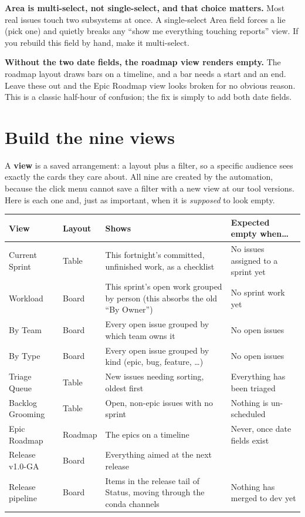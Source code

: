 \documentclass[11pt,a4paper]{report}
\begin{document}
\begin{gotcha}
\textbf{Area is multi-select, not single-select, and that choice matters.} Most real
issues touch two subsystems at once. A single-select Area field forces a lie (pick
one) and quietly breaks any ``show me everything touching reports'' view. If you
rebuild this field by hand, make it multi-select.
\end{gotcha}

\begin{gotcha}
\textbf{Without the two date fields, the roadmap view renders empty.} The roadmap
layout draws bars on a timeline, and a bar needs a start and an end. Leave these
out and the Epic Roadmap view looks broken for no obvious reason. This is a classic
half-hour of confusion; the fix is simply to add both date fields.
\end{gotcha}

\chapter{Build the nine views}

A \textbf{view} is a saved arrangement: a layout plus a filter, so a specific
audience sees exactly the cards they care about. All nine are created by the
automation, because the click menu cannot save a filter with a new view at our tool
versions. Here is each one and, just as important, when it is \emph{supposed} to
look empty.

\begin{center}
\begin{longtable}{@{}p{3.0cm}p{2.0cm}p{4.2cm}p{3.3cm}@{}}
\toprule
\textbf{View} & \textbf{Layout} & \textbf{Shows} & \textbf{Expected empty when\ldots} \\
\midrule
\endhead
Current Sprint & Table & This fortnight's committed, unfinished work, as a checklist & No issues assigned to a sprint yet \\
Workload & Board & This sprint's open work grouped by person (this absorbs the old ``By Owner'') & No sprint work yet \\
By Team & Board & Every open issue grouped by which team owns it & No open issues \\
By Type & Board & Every open issue grouped by kind (epic, bug, feature, \ldots) & No open issues \\
Triage Queue & Table & New issues needing sorting, oldest first & Everything has been triaged \\
Backlog Grooming & Table & Open, non-epic issues with no sprint & Nothing is un-scheduled \\
Epic Roadmap & Roadmap & The epics on a timeline & Never, once date fields exist \\
Release v1.0-GA & Board & Everything aimed at the next release & \\
Release pipeline & Board & Items in the release tail of Status, moving through the conda channels & Nothing has merged to dev yet \\
\bottomrule
\end{longtable}
\end{center}
\end{document}
